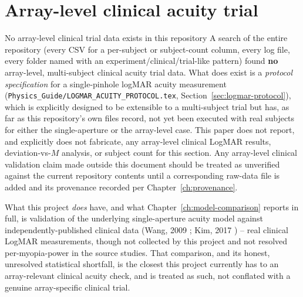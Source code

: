 \section{Array-level clinical acuity trial}
\label{sec:array-exp2}
\begin{warnbox}{No array-level clinical trial data exists in this repository}
A search of the entire repository (every CSV for a per-subject or subject-count column,
every log file, every folder named with an experiment/clinical/trial-like pattern) found
\textbf{no} array-level, multi-subject clinical acuity trial data. What does exist is a
\emph{protocol specification} for a single-pinhole logMAR acuity measurement
(\texttt{Physics\_Guide/LOGMAR\_ACUITY\_PROTOCOL.tex}, Section~\ref{sec:logmar-protocol}),
which is explicitly designed to be extensible to a multi-subject trial but has, as far
as this repository's own files record, not yet been executed with real subjects for
either the single-aperture or the array-level case. This paper does not report, and
explicitly does not fabricate, any array-level clinical LogMAR results, deviation-vs-$M$
analysis, or subject count for this section. Any array-level clinical validation claim
made outside this document should be treated as unverified against the current
repository contents until a corresponding raw-data file is added and its provenance
recorded per Chapter~\ref{ch:provenance}.
\end{warnbox}

What this project \emph{does} have, and what Chapter~\ref{ch:model-comparison} reports
in full, is validation of the underlying single-aperture acuity model against
independently-published clinical data (Wang, 2009 \citep{wang2009}; Kim, 2017
\citep{kim2017}) -- real clinical LogMAR measurements, though not collected by this
project and not resolved per-myopia-power in the source studies. That comparison, and
its honest, unresolved statistical shortfall, is the closest this project currently has
to an array-relevant clinical acuity check, and is treated as such, not conflated with
a genuine array-specific clinical trial.
